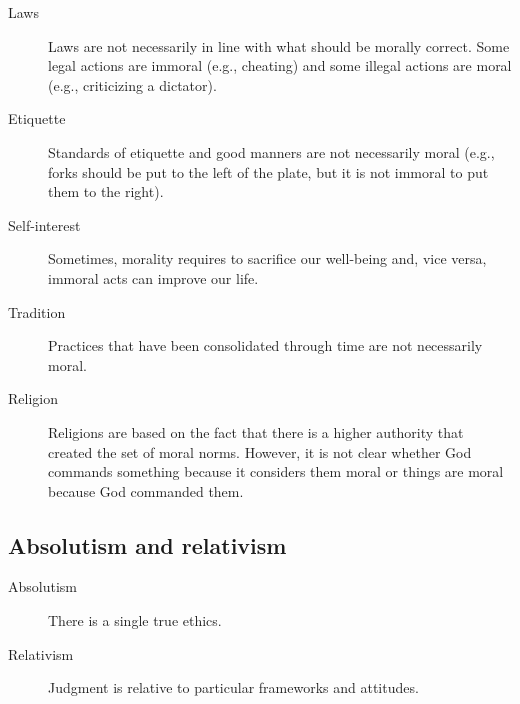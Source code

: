 \begin{description}
    \item[Laws]  
        Laws are not necessarily in line with what should be morally correct. Some legal actions are immoral (e.g., cheating) and some illegal actions are moral (e.g., criticizing a dictator).

    \item[Etiquette] 
        Standards of etiquette and good manners are not necessarily moral (e.g., forks should be put to the left of the plate, but it is not immoral to put them to the right).

    \item[Self-interest]  
        Sometimes, morality requires to sacrifice our well-being and, vice versa, immoral acts can improve our life.

    \item[Tradition]  
        Practices that have been consolidated through time are not necessarily moral.
    
    \item[Religion]  
        Religions are based on the fact that there is a higher authority that created the set of moral norms. However, it is not clear whether God commands something because it considers them moral or things are moral because God commanded them.
\end{description}




\subsection{Absolutism and relativism}

\begin{description}
    \item[Absolutism] 
        There is a single true ethics.

    \item[Relativism] 
        Judgment is relative to particular frameworks and attitudes.
\end{description}


